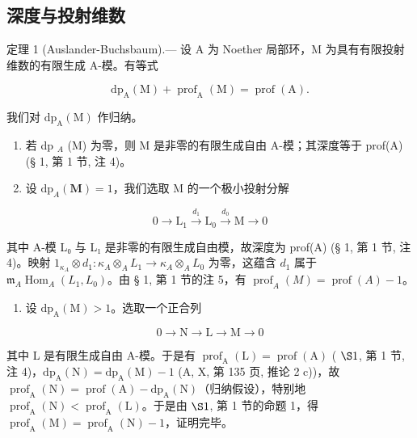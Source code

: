 \subsection{深度与投射维数}

定理 1 (Auslander-Buchsbaum).--- 设 A 为 Noether 局部环，M 为具有有限投射维数的有限生成 A-模。有等式

\[
\mathrm{dp} _ {\mathrm{A}} (\mathrm{M}) + \operatorname{prof} _ {\mathrm{A}} (\mathrm{M}) = \operatorname{prof} (\mathrm{A}).
\]

我们对 \(\mathrm{dp}_{\mathrm{A}}(\mathrm{M})\) 作归纳。

\begin{enumerate}
\def\labelenumi{\alph{enumi})}
\item
  若 dp \(_{A}\) (M) 为零，则 M 是非零的有限生成自由 A-模；其深度等于 prof(A) (§ 1, 第 1 节, 注 4)。
\item
  设 \(\mathrm{dp}_{A}(\mathbf{M}) = 1\)，我们选取 M 的一个极小投射分解
\end{enumerate}

\[
0 \to \mathrm{L} _ {1} \xrightarrow {d _ {1}} \mathrm{L} _ {0} \xrightarrow {d _ {0}} \mathrm{M} \to 0
\]

其中 A-模 L₀ 与 L₁ 是非零的有限生成自由模，故深度为 prof(A) (§ 1, 第 1 节, 注 4)。映射 \(1_{\kappa_{A}} \otimes d_{1} : \kappa_{A} \otimes_{A} L_{1} \longrightarrow \kappa_{A} \otimes_{A} L_{0}\) 为零，这蕴含 \(d_{1}\) 属于 \(\mathfrak{m}_{A} \operatorname{Hom}_{A}(L_{1}, L_{0})\)。由 § 1, 第 1 节的注 5，有 \(\operatorname{prof}_{A}(M) = \operatorname{prof}(A) - 1\)。

\begin{enumerate}
\def\labelenumi{\alph{enumi})}
\setcounter{enumi}{2}
\tightlist
\item
  设 \(\mathrm{dp}_{\mathrm{A}}(\mathrm{M}) > 1\)。选取一个正合列
\end{enumerate}

\[
0 \to \mathrm{N} \longrightarrow \mathrm{L} \longrightarrow \mathrm{M} \to 0
\]

其中 L 是有限生成自由 A-模。于是有 \(\operatorname{prof}_{\mathrm{A}}(\mathrm{L}) = \operatorname{prof}(\mathrm{A})\) ( \(\S 1\), 第 1 节, 注 4)，\(\mathrm{dp}_{\mathrm{A}}(\mathrm{N}) = \mathrm{dp}_{\mathrm{A}}(\mathrm{M}) - 1\) (A, X, 第 135 页, 推论 2 c))，故 \(\operatorname{prof}_{\mathrm{A}}(\mathrm{N}) = \operatorname{prof}(\mathrm{A}) - \mathrm{dp}_{\mathrm{A}}(\mathrm{N})\)（归纳假设），特别地 \(\operatorname{prof}_{\mathrm{A}}(\mathrm{N}) < \operatorname{prof}_{\mathrm{A}}(\mathrm{L})\)。于是由 \(\S 1\), 第 1 节的命题 1，得 \(\operatorname{prof}_{\mathrm{A}}(\mathrm{M}) = \operatorname{prof}_{\mathrm{A}}(\mathrm{N}) - 1\)，证明完毕。

